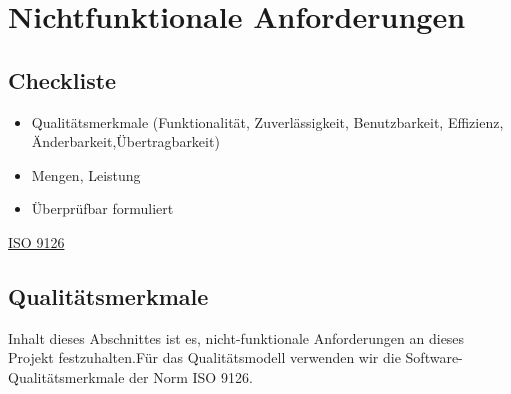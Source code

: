 \chapter{Nichtfunktionale Anforderungen}
	\section{Checkliste}
	\begin{itemize}
		\item Qualitätsmerkmale (Funktionalität, Zuverlässigkeit, Benutzbarkeit,
Effizienz, Änderbarkeit,Übertragbarkeit)
		\item Mengen, Leistung
		
		\item Überprüfbar formuliert
	\end{itemize}
	
	\href{http://de.wikipedia.org/wiki/ISO/IEC_9126}{ISO 9126}
	\section{Qualitätsmerkmale}
	Inhalt dieses Abschnittes ist es, nicht-funktionale Anforderungen an dieses Projekt festzuhalten.Für das Qualitätsmodell verwenden wir die Software-Qualitätsmerkmale der Norm ISO 9126.
